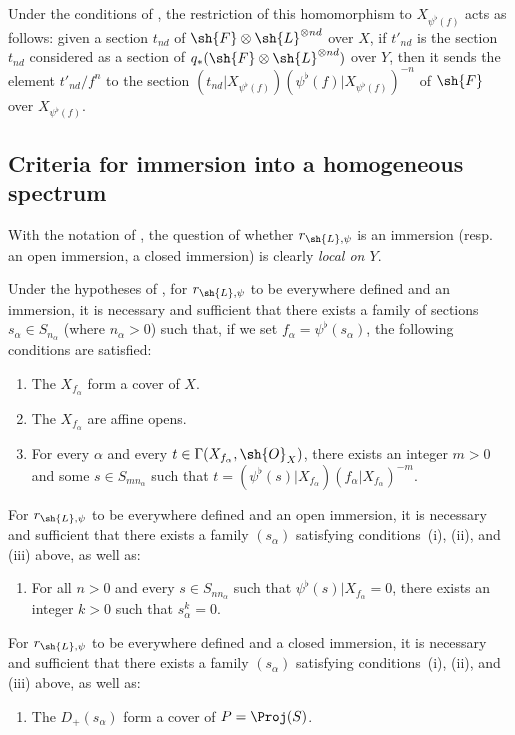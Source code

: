\begin{remarks}[3.7.9]
\begin{enumerate}
    Under the conditions of , the restriction of this homomorphism to $X_{\psi^\flat(f)}$ acts as follows:
    given a section $t_{nd}$ of $\sh{F}\otimes\sh{L}^{\otimes nd}$ over $X$, if $t'_{nd}$ is the section $t_{nd}$ considered as a section of $q_*(\sh{F}\otimes\sh{L}^{\otimes nd})$ over $Y$, then it sends the element $t'_{nd}/f^n$ to the section $(t_{nd}|X_{\psi^\flat(f)})(\psi^\flat(f)|X_{\psi^\flat(f)})^{-n}$ of $\sh{F}$ over $X_{\psi^\flat(f)}$.
\end{enumerate}
\end{remarks}


\subsection{Criteria for immersion into a homogeneous spectrum}
\label{subsection:II.3.8}

\begin{env}[3.8.1]
\label{II.3.8.1}
With the notation of , the question of whether $r_{\sh{L},\psi}$ is an immersion (resp. an open immersion, a closed immersion) is clearly \emph{local on $Y$}.
\end{env}

\begin{proposition}[3.8.2]
\label{II.3.8.2}
Under the hypotheses of , for $r_{\sh{L},\psi}$ to be everywhere defined and an immersion, it is necessary and sufficient that there exists a family of sections $s_\alpha\in S_{n_\alpha}$ (where $n_\alpha>0$) such that, if we set $f_\alpha=\psi^\flat(s_\alpha)$, the following conditions are satisfied:
\begin{enumerate}
  \item[(i)] The $X_{f_\alpha}$ form a cover of $X$.
  \item[(ii)] The $X_{f_\alpha}$ are affine opens.
  \item[(iii)] For every $\alpha$ and every $t\in\Gamma(X_{f_\alpha},\sh{O}_X)$, there exists an integer $m>0$ and some $s\in S_{mn_\alpha}$ such that $t=(\psi^\flat(s)|X_{f_\alpha})(f_\alpha|X_{f_\alpha})^{-m}$.
\end{enumerate}

For $r_{\sh{L},\psi}$ to be everywhere defined and an open immersion, it is necessary and sufficient that there exists a family $(s_\alpha)$ satisfying conditions~(i), (ii), and (iii) above, as well as:
\begin{enumerate}
  \item[(iv)] For all $n>0$ and every $s\in S_{n n_\alpha}$ such that $\psi^\flat(s)|X_{f_\alpha}=0$, there exists an integer $k>0$ such that $s_\alpha^k=0$.
\end{enumerate}

For $r_{\sh{L},\psi}$ to be everywhere defined and a closed immersion, it is necessary and sufficient that there exists a family $(s_\alpha)$ satisfying conditions~(i), (ii), and (iii) above, as well as:
\begin{enumerate}
  \item[(v)] The $D_+(s_\alpha)$ form a cover of $P=\Proj(S)$.
\end{enumerate}
\end{proposition}

